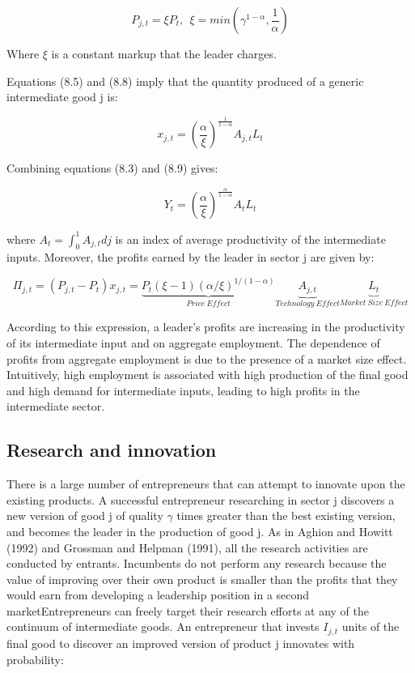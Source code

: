 \documentclass[cn,10pt,math=newtx,citestyle=gb7714-2015,bibstyle=gb7714-2015]{elegantbook}
\begin{document}
{{	\begin{equation}
		P_{j,t} = \xi P_t, ~~ \xi = min( \gamma^{1-\alpha}, \frac{1}{\alpha} )
	\end{equation}
	
	Where $\xi$ is a constant markup that the leader charges.
	
	Equations (8.5) and (8.8) imply that the quantity produced of a generic intermediate good j is:
	
	\begin{equation}
		x_{j,t} = \left(\frac{\alpha}{\xi}\right)^{\frac{1}{1-\alpha}}A_{j,t}L_t
	\end{equation}
	
	Combining equations (8.3) and (8.9) gives:
	
	\begin{equation}
		Y_t = \left(\frac{\alpha}{\xi}\right)^{\frac{\alpha}{1-\alpha}}A_{t}L_t
	\end{equation}
	
	where $A_t = \int_0^1 A_{j,t} dj$ is an index of average productivity of the intermediate inputs. Moreover, the profits earned by the leader in sector j are given by:
	
	$$\Pi_{j,t} = (P_{j,t} - P_t)x_{j,t} =\underbrace{P_t (\xi-1)(\alpha / \xi)^{1 /(1-\alpha)}}_{Price~Effect} \underbrace{A_{j,t}}_{Technology~Effect} \underbrace{L_t}_{Market~Size~Effect}$$
	
	According to this expression, a leader’s profits are increasing in the productivity of its intermediate input and on aggregate employment. The dependence of profits from aggregate employment is due to the presence of a market size effect. Intuitively, high employment is associated with high production of the final good and high demand for intermediate inputs, leading to high profits in the intermediate sector.
	
	\subsection{Research and innovation}
	
	There is a large number of entrepreneurs that can attempt to innovate upon the existing products. A successful entrepreneur researching in sector j discovers a new version of good j of quality $\gamma$ times greater than the best existing version, and becomes the leader in the production of good j. As in Aghion and Howitt (1992) and Grossman and Helpman (1991), all the research activities are conducted by entrants. Incumbents do not perform any research because the value of improving over their own product is smaller than the profits that they would earn from developing a leadership position in a second marketEntrepreneurs can freely target their research efforts at any of the continuum of intermediate goods. An entrepreneur that invests $I_{j,t}$ units of the final good to discover an improved version of product j innovates with probability:
	
}}
\end{document}
